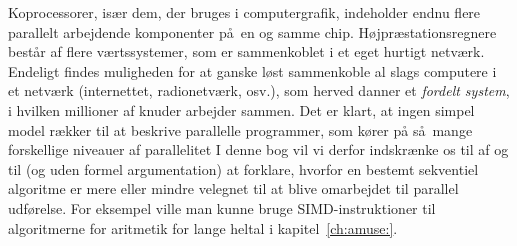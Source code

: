 Koprocessorer, 
især dem, der bruges i computergrafik,
indeholder endnu flere parallelt arbejdende komponenter på en og samme chip.
Højpræstationsregnere
består af flere værtssystemer, som er sammenkoblet i et eget hurtigt netværk.
Endeligt findes muligheden for at ganske løst sammenkoble al slags computere i et netværk (internettet, radionetværk, osv.), som herved danner et \emph{fordelt system}, 
i hvilken millioner af knuder arbejder sammen.
Det er klart, at ingen simpel model rækker til at beskrive parallelle programmer, som kører på så mange forskellige niveauer af parallelitet
I denne bog vil vi derfor indskrænke os til af og til (og uden formel argumentation) at forklare, hvorfor en bestemt sekventiel algoritme er mere eller mindre velegnet til at blive omarbejdet til parallel udførelse.
For eksempel ville man kunne bruge SIMD-instruktioner til algoritmerne for aritmetik for lange heltal
 i kapitel~\ref{ch:amuse:}.
